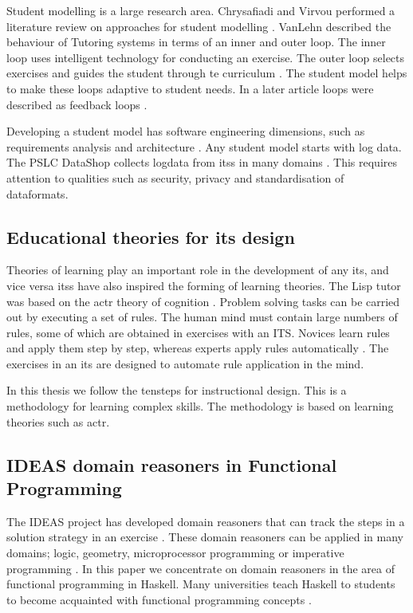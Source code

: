 Student modelling is a large research area.
Chrysafiadi and Virvou performed a literature review on approaches for student modelling \citep{chrysafiadi_2013}.
VanLehn described the behaviour of Tutoring systems in terms of an inner and outer loop.
The inner loop uses intelligent technology for conducting an exercise.
The outer loop selects exercises and guides the student through te curriculum \citep{vanlehn2006}.
The student model helps to make these loops adaptive to student needs.
In a later article loops were described as  feedback loops \citep{loops}.

Developing a student model has software engineering dimensions, such as  requirements analysis and architecture \citep{Hatzilygeroudis2004, Jeremi2004}.
Any student model starts with log data. 
The PSLC DataShop collects logdata from \glspl{its} in many domains   \citep{VanLehn2007}.
This requires attention to qualities such as security, privacy and standardisation of dataformats.



\subsection{Educational theories for \gls{its} design}
Theories of learning play an important role in the development of any \gls{its},
and vice versa \glspl{its} have also inspired the forming of learning theories. 
The Lisp tutor was based on the \gls{actr} theory of cognition \citep{anderson_1996}. 
Problem solving tasks can be carried out by executing a set of rules.
The human mind must contain large numbers of rules, some of which are obtained in exercises with an ITS.
Novices learn rules and apply them step by step, whereas experts apply rules automatically \citep{skill}.
The exercises in an \gls{its} are designed to automate rule application in the mind.

In this thesis we follow the \gls{tensteps} for instructional design.
This is a methodology for learning complex skills. 
The methodology is based on learning theories such as \gls{actr}.


\subsection{IDEAS domain reasoners in Functional Programming}

The IDEAS project has developed domain reasoners that can track the steps in a solution strategy in an exercise \citep{ideas1, UUCS2014005}.
These domain reasoners can be applied in many domains; logic, geometry, microprocessor programming or imperative programming \citep{p43-keuning}.
In this paper we concentrate on domain reasoners in the area of functional programming in Haskell.
Many universities teach Haskell to students to become acquainted with functional programming concepts \citep{hutton_2016}.

